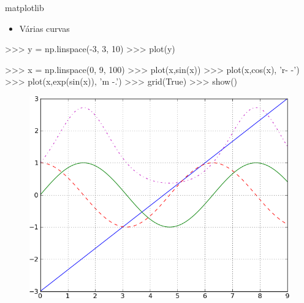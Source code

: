\documentclass[12pt,t,graphics]{beamer}
\newcommand{\bi}{\begin{itemize}}
\newcommand{\ei}{\end{itemize}}
\begin{document}
\begin{frame}[t,fragile]{matplotlib}
	\vspace{-0.5cm}
	\bi
	\item Várias curvas
	\ei
	\begin{python}
>>> y = np.linspace(-3, 3, 10)
>>> plot(y)
		
>>> x = np.linspace(0, 9, 100)
>>> plot(x,sin(x))
>>> plot(x,cos(x), 'r- -')
>>> plot(x,exp(sin(x)), 'm -.')
>>> grid(True)
>>> show()	
		\end{python}
		\begin{figure}
			\centering
			\includegraphics[scale=0.3]{img/plot3.png}
		\end{figure}
\end{frame}
\end{document}
